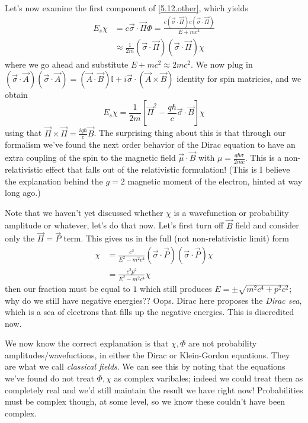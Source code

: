 \documentclass[10pt]{report}
\begin{document}
Let's now examine the first component of \eqref{5.12.other}, which yields
\begin{align}
    E_s\chi &= c\vec{\sigma} \cdot \vec{\Pi}\Phi = \frac{c\left( \vec{\sigma} \cdot \vec{\Pi} \right)c\left( \vec{\sigma} \cdot \vec{\Pi} \right)\hat{}}{E + mc^2}\\
    &\approx \frac{1}{2m} \left( \vec{\sigma} \cdot \vec{\Pi} \right)\left( \vec{\sigma} \cdot \vec{\Pi} \right) \chi
\end{align}
where we go ahead and substitute $E + mc^2 \approx 2mc^2$. We now plug in $\left( \vec{\sigma}\cdot \vec{A} \right)\left( \vec{\sigma}\cdot \vec{A} \right) = \left( \vec{A} \cdot \vec{B} \right)\mathbb{I} + i\vec{\sigma} \cdot \left( \vec{A} \times \vec{B} \right)$ identity for spin matricies, and we obtain
\begin{equation}
    E_s\chi = \frac{1}{2m}\left[ \vec{\Pi}^2 - \frac{q\hbar}{c}\vec{\sigma} \cdot \vec{B} \right]\chi
\end{equation}
using that $\vec{\Pi} \times \vec{\Pi} = \frac{iq\hbar}{c}\vec{B}$. The surprising thing about this is that through our formalism we've found the next order behavior of the Dirac equation to have an extra coupling of the spin to the magnetic field $\vec{\mu} \cdot \vec{B}$ with $\mu = \frac{q\hbar \sigma}{2mc}$. This is a non-relativistic effect that falls out of the relativistic formulation! (This is I believe the explanation behind the $g=2$ magnetic moment of the electron, hinted at way long ago.) 

Note that we haven't yet discussed whether $\chi$ is a wavefunction or probability amplitude or whatever, let's do that now. Let's first turn off $\vec{B}$ field and consider only the $\vec{\Pi} = \vec{P}$ term. This gives us in the full (not non-relativistic limit) form
\begin{align}
    \chi &= \frac{c^2}{E^2 - m^2c^4}(\vec{\sigma} \cdot \vec{P})(\vec{\sigma} \cdot \vec{P})\chi\\
    &= \frac{c^2p^2}{E^2 - m^2c^4} \chi
\end{align}
then our fraction must be equal to $1$ which still produces $E = \pm\sqrt{m^2c^4 + p^2c^2}$; why do we still have negative energies?? Oops. Dirac here proposes the \emph{Dirac sea}, which is a sea of electrons that fills up the negative energies. This is discredited now.

We now know the correct explanation is that $\chi, \Phi$ are not probability amplitudes/wavefuctions, in either the Dirac or Klein-Gordon equations. They are what we call \emph{classical fields}. We can see this by noting that the equations we've found do not treat $\Phi, \chi$ as complex varibales; indeed we could treat them as completely real and we'd still maintain the result we have right now! Probabilities must be complex though, at some level, so we know these couldn't have been complex.
\end{document}
